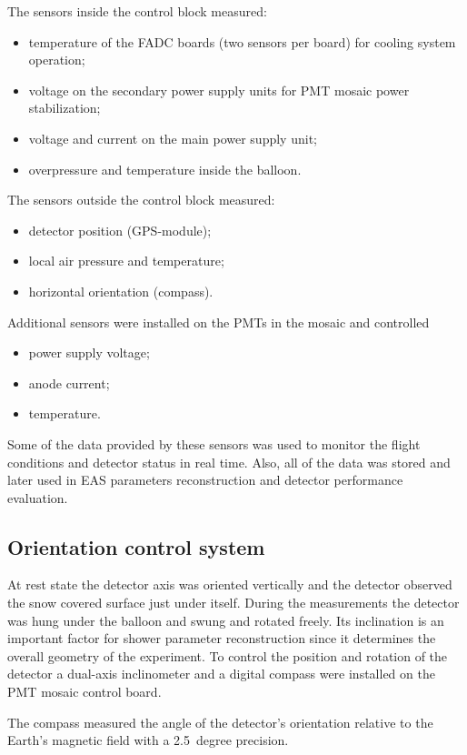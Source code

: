 \documentclass[final,5p,times,twocolumn]{elsarticle}
\begin{document}
The sensors inside the control block measured:
\begin{itemize}[nosep]
\item temperature of the FADC boards (two sensors per board) for cooling system operation;
\item voltage on the secondary power supply units for PMT mosaic power stabilization;
\item voltage and current on the main power supply unit;
\item overpressure and temperature inside the balloon.
\end{itemize}
The sensors outside the control block measured:
\begin{itemize}[nosep]
\item detector position (GPS-module);
\item local air pressure and temperature;
\item horizontal orientation (compass).
\end{itemize}
Additional sensors were installed on the PMTs in the mosaic and controlled
\begin{itemize}[nosep]
\item power supply voltage;
\item anode current;
\item temperature.
\end{itemize}

Some of the data provided by these sensors was used to monitor the flight conditions and detector status in real time. Also, all of the data was stored and later used in EAS parameters reconstruction and detector performance evaluation.

\subsection{Orientation control system}
\label{sect:orientation}

At rest state the detector axis was oriented vertically and the detector observed the snow covered surface just under itself. During the measurements the detector was hung under the balloon and swung and rotated freely. Its inclination is an important factor for shower parameter reconstruction since it determines the overall geometry of the experiment. To control the position and rotation of the detector a dual-axis inclinometer and a digital compass were installed on the PMT mosaic control board. 

The compass measured the angle of the detector's orientation relative to the Earth's magnetic field with a 2.5~degree precision.
\end{document}
